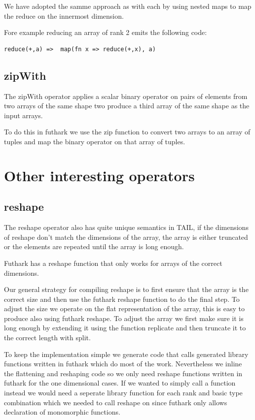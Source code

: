 \documentclass[11pt]{article}
\begin{document}
We have adopted the samme approach as with each by using nested maps to map the reduce on the innermost dimension.

Fore example reducing an array of rank 2 emits the following code:

\begin{lstlisting}[numbers=none,frame=none]
reduce(+,a)	=> 	map(fn x => reduce(+,x), a)
\end{lstlisting}

\subsection{zipWith}

The zipWith operator applies a scalar binary operator on pairs of elements from two arrays of the same shape two
produce a third array of the same shape as the input arrays.

 To do this in futhark we use the zip function to convert two arrays to an array of tuples and map the binary operator on that array of tuples.

\section{Other interesting operators}

\subsection{reshape}

The reshape operator also has quite unique semantics in TAIL, if the dimensions of reshape don't match the dimensions of the array, the
array is either truncated or the elements are repeated until the array is long enough.

Futhark has a reshape function that only works for arrays of the correct dimensions.

Our general strategy for compiling reshape is to first ensure that the array is the correct size and then use the futhark reshape
function to do the final step. To adjust the size we operate on the flat representation of the array, this is easy to produce also
using futhark reshape. To adjust the array we first make sure it is long enough by extending it using the function replicate and then
truncate it to the correct length with split.

To keep the implementation simple we generate code that calls generated library functions written in futhark which do most of the work.
Nevertheless we inline the flattening and reshaping code so we only need reshape functions written in futhark
for the one dimensional cases. If we wanted to simply call a function instead we would need a seperate library function for each
rank and basic type combination which we needed to call reshape on since futhark only allows declaration of monomorphic functions.
\end{document}
